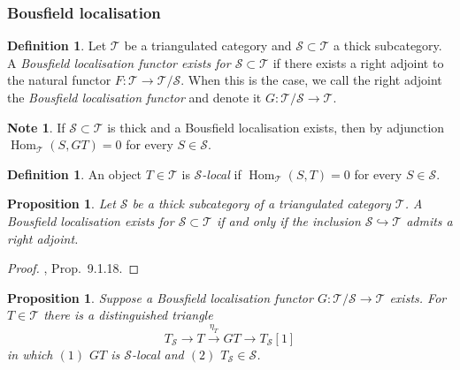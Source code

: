 \documentclass[12pt,a4paper]{article}
\newtheorem{proposition}[theorem]{Proposition}
\theoremstyle{definition}
\newtheorem{definition}[theorem]{Definition}
\newtheorem{note}[theorem]{Note}
\newcommand{\Hom}{\operatorname{Hom}}
\begin{document}
\subsubsection{Bousfield localisation}

\begin{definition}\label{def:Bousfield-loc}
Let $\mathcal{T}$ be a triangulated category and $\mathcal{S}\subset\mathcal{T}$ a
thick subcategory.  A \emph{Bousfield localisation functor exists for
$\mathcal{S}\subset\mathcal{T}$} if there exists a right adjoint to the natural
functor $F:\mathcal{T}\to\mathcal{T}/\mathcal{S}$.  When this is the case, we call
the right adjoint the \emph{Bousfield localisation functor} and denote it
$G:\mathcal{T}/\mathcal{S}\to\mathcal{T}$.
\end{definition}

\begin{note}\label{note:S-local}
If $\mathcal{S}\subset\mathcal{T}$ is thick and a Bousfield localisation exists, then
by adjunction $\Hom_\mathcal{T}(S,GT)=0$ for every $S\in\mathcal{S}$.
\end{note}

\begin{definition}\label{def:S-local}
An object $T\in\mathcal{T}$ is \emph{$\mathcal{S}$-local} if
$\Hom_\mathcal{T}(S,T)=0$ for every $S\in\mathcal{S}$.
\end{definition}

\begin{proposition}\label{prop:Bousfield-exists}
Let $\mathcal{S}$ be a thick subcategory of a triangulated category $\mathcal{T}$.  A
Bousfield localisation exists for $\mathcal{S}\subset\mathcal{T}$ if and only if the
inclusion $\mathcal{S}\hookrightarrow\mathcal{T}$ admits a right adjoint.
\end{proposition}
\begin{proof}
\cite{Nee01}, Prop.\ 9.1.18.
\end{proof}

\begin{proposition}\label{prop:Bousfield-triangle}
Suppose a Bousfield localisation functor $G:\mathcal{T}/\mathcal{S}\to\mathcal{T}$
exists.  For $T\in\mathcal{T}$ there is a distinguished triangle
\[
  T_\mathcal{S} \longrightarrow T \xrightarrow{\eta_T} GT \longrightarrow T_\mathcal{S}[1]
\]
in which $(1)$ $GT$ is $\mathcal{S}$-local and $(2)$ $T_\mathcal{S}\in\mathcal{S}$.
\end{proposition}
\end{document}
